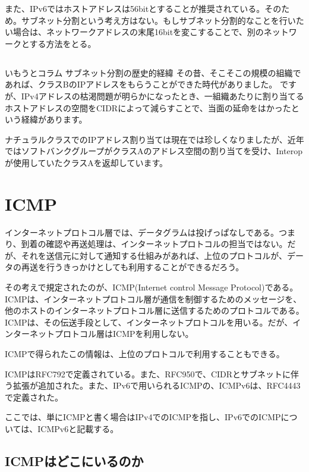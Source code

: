 また、IPv6ではホストアドレスは56bitとすることが推奨されている。そのため。サブネット分割という考え方はない。もしサブネット分割的なことを行いたい場合は、ネットワークアドレスの末尾16bitを変こすることで、別のネットワークとする方法をとる。

\subsection*{}
\begin{itembox}[l]{いもうとコラム サブネット分割の歴史的経緯}
その昔、そこそこの規模の組織であれば、クラスBのIPアドレスをもらうことができた時代がありました。
ですが、IPv4アドレスの枯渇問題が明らかになったとき、一組織あたりに割り当てるホストアドレスの空間をCIDRによって減らすことで、当面の延命をはかったという経緯があります。

ナチュラルクラスでのIPアドレス割り当ては現在では珍しくなりましたが、近年ではソフトバンクグループがクラスAのアドレス空間の割り当てを受け、Interopが使用していたクラスAを返却しています。

\end{itembox}



\section{ICMP}
インターネットプロトコル層では、データグラムは投げっぱなしである。つまり、到着の確認や再送処理は、インターネットプロトコルの担当ではない。だが、それを送信元に対して通知する仕組みがあれば、上位のプロトコルが、データの再送を行うきっかけとしても利用することができるだろう。

その考えで規定されたのが、ICMP(Internet control Message Protocol)である。
ICMPは、インターネットプロトコル層が通信を制御するためのメッセージを、他のホストのインターネットプロトコル層に送信するためのプロトコルである。ICMPは、その伝送手段として、インターネットプロトコルを用いる。だが、インターネットプロトコル層はICMPを利用しない。

ICMPで得られたこの情報は、上位のプロトコルで利用することもできる。

ICMPはRFC792で定義されている。また、RFC950で、CIDRとサブネットに伴う拡張が追加された。また、IPv6で用いられるICMPの、ICMPv6は、RFC4443で定義された。

ここでは、単にICMPと書く場合はIPv4でのICMPを指し、IPv6でのICMPについては、ICMPv6と記載する。

\subsection{ICMPはどこにいるのか}

